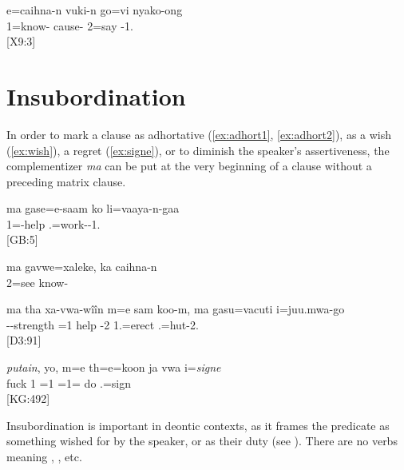 \ea\label{ex:vukin} \gll e=caihna-n vuki-n go=vi nyako-ong\\
 1=know- cause- 2=say -1.\\
\glt {} {[X9:3]} 
\z

\section{Insubordination}
\label{ssec:Insub}
In order to mark a clause as adhortative (\ref{ex:adhort1}, \ref{ex:adhort2}), as a wish (\ref{ex:wish}), a regret (\ref{ex:signe}), or to diminish the speaker's assertiveness, the complementizer \textit{ma} can be put at the very beginning of a clause without a preceding matrix clause. 


\ea\label{ex:adhort1}
\gll ma gase=e-saam ko li=vaaya-n-gaa\\
  1=-help  .=work--1.\\
\glt {} {[GB:5]}
\z


\ea\label{ex:adhort2}
\gll ma gavwe=xaleke, ka caihna-n\\
  2=see  know-\\
\glt {}
\z

\ea\label{ex:wish}\gll ma tha xa-vwa-wîîn m=e sam koo-m, ma gasu=vacuti i=juu.mwa-go\\
   --strength =1 help -2  1.=erect .=hut-2.\\
\glt {} {[D3:91]}
\z

\ea \label{ex:signe}\gll \textit{putain}, yo, m=e th=e=koon ja vwa i=\textit{signe}\\
 fuck 1 =1 =1=  do .=sign\\
\glt {} {[KG:492]}
\z

Insubordination is important in deontic contexts, as it frames the predicate as something wished for by the speaker, or as their duty (see ). There are no verbs meaning , ,  etc.
